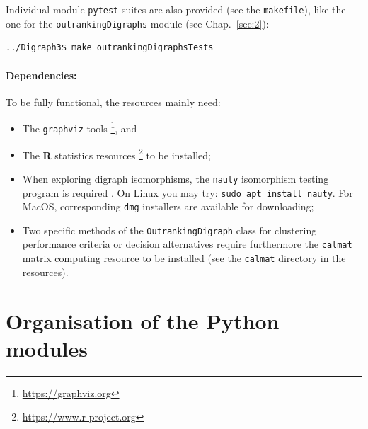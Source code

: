 Individual module \texttt{pytest} suites are also provided (see the \texttt{makefile}), like the one for the \texttt{outrankingDigraphs} module (see Chap.~\ref{sec:2}):
\begin{lstlisting}[language=sh, backgroundcolor=\color{White}, numbers=none]
../Digraph3$ make outrankingDigraphsTests
\end{lstlisting}

\paragraph{\textbf{Dependencies:}}

\noindent To be fully functional, the \Digraph resources mainly need:
\begin{itemize}[leftmargin=0.5cm,listparindent=0em,rightmargin=0.2cm,topsep=3pt]
\item The \texttt{graphviz} tools \citep{graphviz}\footnote{\href{https://graphviz.org}{https://graphviz.org}}, and 
\item The \textbf{R} statistics resources \footnote{\href{https://www.r-project.org}{https://www.r-project.org}} to be installed;
\item When exploring digraph isomorphisms, the \texttt{nauty} isomorphism testing program is required \citep*{nauty}. On Linux you may try: \texttt{sudo apt install nauty}. For MacOS, corresponding \texttt{dmg} installers are available for downloading;
\item Two specific methods of the \texttt{OutrankingDigraph} class for clustering performance criteria or decision alternatives require furthermore the \texttt{calmat} matrix computing resource to be installed (see the \texttt{calmat} directory in the \Digraph resources).
\end{itemize}

\section{Organisation of the \Digraph Python modules}
\label{sec:1.2}

